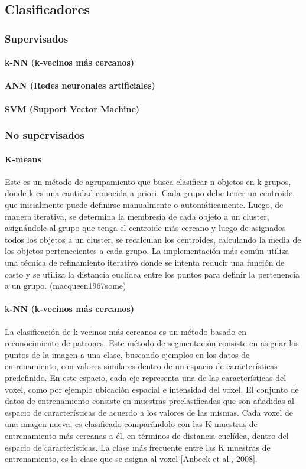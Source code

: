 \subsection{Clasificadores}
\subsubsection{Supervisados}
\paragraph{k-NN (k-vecinos más cercanos)}
\paragraph{ANN (Redes neuronales artificiales)}
\paragraph{SVM (Support Vector Machine)}
\subsubsection{No supervisados}
\paragraph{K-means}
Este es un método de agrupamiento que busca clasificar n objetos en k grupos, donde k es una cantidad conocida a priori. Cada grupo debe tener un centroide, que inicialmente puede definirse manualmente o automáticamente. Luego, de manera iterativa, se determina la membresía de cada objeto a un cluster, asignándole al grupo que tenga el centroide más cercano y luego de asignados todos los objetos a un cluster, se recalculan los centroides, calculando la media de los objetos pertenecientes a cada grupo. La implementación más común utiliza una técnica de refinamiento iterativo donde se intenta reducir una función de costo y se utiliza la distancia euclídea entre los puntos para definir la pertenencia a un grupo. (macqueen1967some)

\paragraph{k-NN (k-vecinos más cercanos)}
La clasificación de k-vecinos más cercanos es un método basado en reconocimiento de patrones. Este método de segmentación consiste en asignar los puntos de la imagen a una clase, buscando ejemplos en los datos de entrenamiento, con valores similares dentro de un espacio de características predefinido. En este espacio, cada eje representa una de las características del voxel, como por ejemplo ubicación espacial e intensidad del voxel. El conjunto de datos de entrenamiento consiste en muestras preclasificadas que son añadidas al espacio de características de acuerdo a los valores de las mismas. Cada voxel de una imagen nueva, es clasificado comparándolo con las K muestras de entrenamiento más cercanas a él, en términos de distancia euclídea, dentro del espacio de características. La clase más frecuente entre las K muestras de entrenamiento, es la clase que se asigna al voxel [Anbeek et al., 2008].


